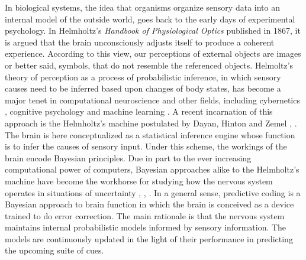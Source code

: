 \documentclass[11pt,twocolumn]{article}
\begin{document}
In biological systems, the idea that organisms organize sensory data into an internal model of the outside world, goes back to the early days of experimental psychology. In Helmholtz's \emph{Handbook of Physiological Optics} published in 1867, it is argued that the brain unconsciously adjusts itself to produce a coherent experience. According to this view, our perceptions of external objects are images or better said, symbols, that do not resemble the referenced objects.  Helmoltz's theory of perception as a process of probabilistic inference, in which sensory causes need to be inferred based upon changes of body states, has become a major tenet in computational neuroscience \citep{Dayan:2002} and other fields, including cybernetics \citep{ashby_introduction_2015}, cognitive psychology \citep{neisser_cognitive_2014} and machine learning \citep{neal_view_1998}.
A recent incarnation of this approach is the Helmholtz's machine postulated by Dayan, Hinton and Zemel \citep{dayan_helmholtz_1995}, \citep{dayan_varieties_1996}. The brain is here conceptualized as a statistical inference engine whose function is to infer the causes of sensory input. 
Under this scheme, the workings of the brain encode Bayesian principles. Due in part to the ever increasing computational power of computers, Bayesian approaches alike to the Helmholtz's machine have become the workhorse for studying how the nervous system operates in situations of uncertainty \citep{rao_predictive_1999}, \citep{knill_bayesian_2004}, \citep{friston_history_2012}. In a general sense, predictive coding is a Bayesian approach to brain function in which the brain is conceived as a device trained to do error correction. The main rationale is that the nervous system maintains internal probabilistic models informed by sensory information. The models are continuously updated in the light of their performance in predicting the upcoming suite of cues.
\end{document}
